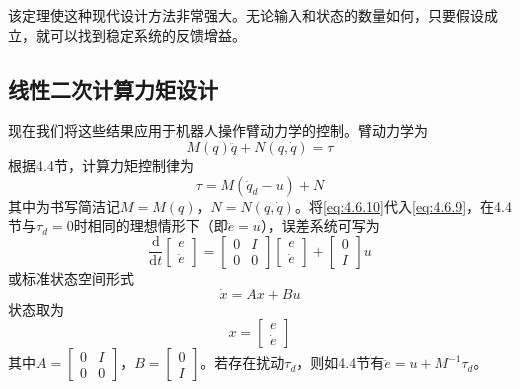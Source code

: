 \documentclass[UTF8]{ctexart}
\theoremstyle{definition}
\newcommand{\dd}{\mathrm{d}}
\begin{document}
该定理使这种现代设计方法非常强大。无论输入和状态的数量如何，只要假设成立，就可以找到稳定系统的反馈增益。

\subsection{线性二次计算力矩设计}

现在我们将这些结果应用于机器人操作臂动力学的控制。臂动力学为
\begin{equation}\label{eq:4.6.9}
    M(q)\ddot{q} + N(q, \dot{q}) = \tau
\end{equation}
根据4.4节，计算力矩控制律为
\begin{equation}\label{eq:4.6.10}
    \tau = M(\ddot{q}_d - u) + N
\end{equation}
其中为书写简洁记$M=M(q)$，$N=N(q,\dot{q})$。将\eqref{eq:4.6.10}代入\eqref{eq:4.6.9}，在4.4节与$\tau_d=0$时相同的理想情形下（即$\ddot{e}=u$），误差系统可写为
\begin{equation}\label{eq:4.6.11}
    \frac{\dd}{\dd t}\begin{bmatrix} e \\ \dot{e} \end{bmatrix} = \begin{bmatrix} 0 & I \\ 0 & 0 \end{bmatrix}\begin{bmatrix} e \\ \dot{e} \end{bmatrix} + \begin{bmatrix} 0 \\ I \end{bmatrix}u
\end{equation}
或标准状态空间形式
\begin{equation}\label{eq:4.6.12}
    \dot{x} = Ax + Bu
\end{equation}
状态取为
\begin{equation}\label{eq:4.6.13}
    x = \begin{bmatrix} e \\ \dot{e} \end{bmatrix}
\end{equation}
其中$A=\begin{bmatrix} 0 & I \\ 0 & 0 \end{bmatrix}$，$B=\begin{bmatrix} 0 \\ I \end{bmatrix}$。若存在扰动$\tau_d$，则如4.4节有$\ddot{e}=u+M^{-1}\tau_d$。
\end{document}
